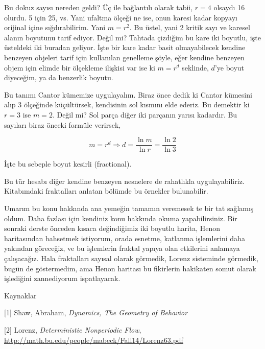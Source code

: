 \documentclass[12pt,fleqn]{article}\usepackage{../../common}
\begin{document}
Bu dokuz sayısı nereden geldi? Üç ile bağlantılı olarak tabii, $r = 4$
olsaydı 16 olurdu. 5 için 25, vs. Yani ufaltma ölçeği ne ise, onun karesi
kadar kopyayı orijinal içine sığdırabilirim. Yani $m = r ^2$. Bu üstel,
yani 2 kritik sayı ve karesel alanın boyutunu tarif ediyor. Değil mi?
Tahtada çizdiğim bu kare iki boyutlu, işte üsteldeki iki buradan
geliyor. İşte bir kare kadar basit olmayabilecek kendine benzeyen objeleri
tarif için kullanılan genelleme şöyle, eğer kendine benzeyen objem için
elimde bir ölçekleme ilişkisi var ise ki $m = r^d$ seklinde, $d$'ye boyut
diyeceğim, ya da benzerlik boyutu.

Bu tanımı Cantor kümemize uygulayalım. Biraz önce dedik ki Cantor kümesini
alıp 3 ölçeğinde küçültürsek, kendisinin sol kısmını elde ederiz. Bu
demektir ki $r=3$ ise $m=2$. Değil mi? Sol parça diğer iki parçanın yarısı
kadardır. Bu sayıları biraz önceki formüle verirsek,

$$ m = r^d \Rightarrow d = \frac{\ln m}{\ln r} = \frac{\ln 2}{\ln 3}$$

İşte bu sebeple boyut kesirli (fractional).

Bu tür hesabı diğer kendine benzeyen nesnelere de rahatlıkla
uygulayabiliriz. Kitabımdaki fraktalları anlatan bölümde bu örnekler
bulunabilir.

Umarım bu konu hakkında ana yemeğin tamamın veremesek te bir tat sağlamış
oldum. Daha fazlası için kendiniz konu hakkında okuma yapabilirsiniz. Bir
sonraki derste önceden kısaca değindiğimiz iki boyutlu harita, Henon
haritasından bahsetmek istiyorum, orada esnetme, katlanma işlemlerini daha
yakından göreceğiz, ve bu işlemlerin fraktal yapıya olan etkilerini
anlamaya çalışacağız. Hala fraktalları sayısal olarak görmedik, Lorenz
sisteminde görmedik, bugün de göstermedim, ama Henon haritası bu fikirlerin
hakikaten somut olarak işlediğini zannediyorum ispatlayacak.

Kaynaklar

[1] Shaw, Abraham, {\em Dynamics, The Geometry of Behavior}

[2] Lorenz, {\em Deterministic Nonperiodic Flow}, 
    \url{http://math.bu.edu/people/mabeck/Fall14/Lorenz63.pdf}
\end{document}
